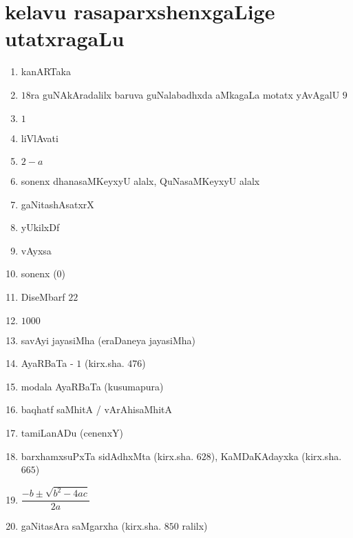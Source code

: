 \chapter{kelavu rasaparxshenxgaLige utatxragaLu}\label{chap24}

\begin{enumerate}
  \renewcommand{\labelenumi}{\rm(\theenumi)}
  \itemsep=1pt
\item kanARTaka

\item $18$ra guNAkAradalilx baruva guNalabadhxda aMkagaLa motatx yAvAgalU $9$

\item $1$

\item liVlAvati 

\item $2-a$

\item sonenx dhanasaMKeyxyU alalx, QuNasaMKeyxyU alalx 

\item gaNitashAsatxrX

\item yUkilxDf

\item vAyxsa

\item sonenx ($0$)

\item DiseMbarf $22$

\item $1000$

\item savAyi jayasiMha (eraDaneya jayasiMha)

\item AyaRBaTa - $1$ (kirx.sha. $476$)

\item modala AyaRBaTa (kusumapura)

\item baqhatf saMhitA / vArAhisaMhitA 

\item tamiLanADu (cenenxY)

\item barxhamxsuPxTa sidAdhxMta (kirx.sha. $628$), KaMDaKAdayxka (kirx.sha. $665$)

\item $\dfrac{-b \pm \sqrt{b^2 - 4ac}}{2a}$

\item gaNitasAra saMgarxha (kirx.sha. $850$ ralilx)


\end{enumerate}
